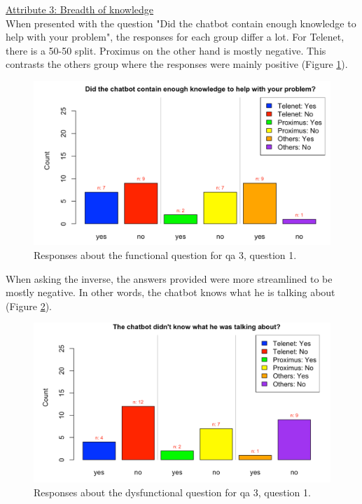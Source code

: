 \break
\ul{Attribute 3: Breadth of knowledge}\\
\break
When presented with the question "Did the chatbot contain enough knowledge to help with your problem", the responses for each group differ a lot. For Telenet, there is a 50-50 split. Proximus on the other hand is mostly negative. This contrasts the others group where the responses were mainly positive (Figure \ref{fig:Q3}).\\
\begin{figure}[!htb]
	\centering
	\includegraphics[width=375pt]{../LaTeX/Figures/Comparative/Q3.png}
	\caption{Responses about the functional question for \acrshort{qa} 3, question 1.}\label{fig:Q3}
\end{figure}
\break
When asking the inverse, the answers provided were more streamlined to be mostly negative. In other words, the chatbot knows what he is talking about (Figure \ref{fig:DQ3}).\\
\begin{figure}[!htb]
	\centering
	\includegraphics[width=375pt]{../LaTeX/Figures/Comparative/DQ3.png}
	\caption{Responses about the dysfunctional question for \acrshort{qa} 3, question 1.}\label{fig:DQ3}
\end{figure}
